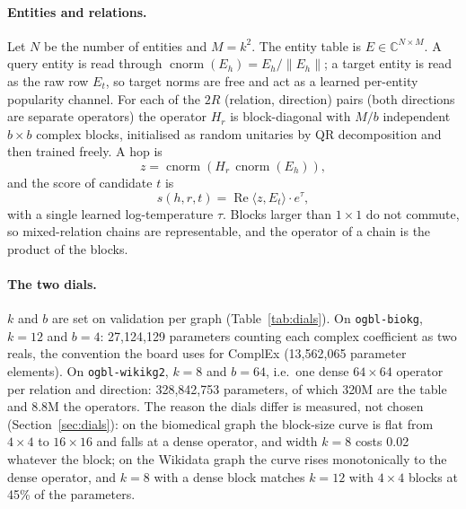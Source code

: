\documentclass[11pt,a4paper]{article}
\newcommand{\C}{\mathbb{C}}
\newcommand{\cnorm}{\operatorname{cnorm}}
\newcommand{\Rel}{\operatorname{Re}}
\begin{document}
\paragraph{Entities and relations.}
Let $N$ be the number of entities and $M=k^2$. The entity table is
$E\in\C^{N\times M}$. A query entity is read through
$\cnorm(E_h)=E_h/\lVert E_h\rVert$; a target entity is read as the raw
row $E_t$, so target norms are free and act as a learned per-entity
popularity channel. For each of the $2R$ (relation, direction) pairs
(both directions are separate operators) the operator $H_r$ is
block-diagonal with $M/b$ independent $b\times b$ complex blocks,
initialised as random unitaries by QR decomposition and then trained
freely. A hop is
\begin{equation}
  z = \cnorm(H_r\,\cnorm(E_h)),
\end{equation}
and the score of candidate $t$ is
\begin{equation}
  s(h,r,t) = \Rel\langle z, E_t\rangle\cdot e^{\tau},
\end{equation}
with a single learned log-temperature $\tau$. Blocks larger than
$1\times1$ do not commute, so mixed-relation chains are representable,
and the operator of a chain is the product of the blocks.

\paragraph{The two dials.}
$k$ and $b$ are set on validation per graph (Table~\ref{tab:dials}). On
\texttt{ogbl-biokg}, $k=12$ and $b=4$: 27{,}124{,}129 parameters counting
each complex coefficient as two reals, the convention the board uses for
ComplEx (13{,}562{,}065 parameter elements). On \texttt{ogbl-wikikg2},
$k=8$ and $b=64$, i.e.\ one dense $64\times64$ operator per relation and
direction: 328{,}842{,}753 parameters, of which 320M are the table and
8.8M the operators. The reason the dials differ is measured, not chosen
(Section~\ref{sec:dials}): on the biomedical graph the block-size curve
is flat from $4\times4$ to $16\times16$ and falls at a dense operator, and
width $k=8$ costs 0.02 whatever the block; on the Wikidata graph the
curve rises monotonically to the dense operator, and $k=8$ with a dense
block matches $k=12$ with $4\times4$ blocks at 45\% of the parameters.
\end{document}
